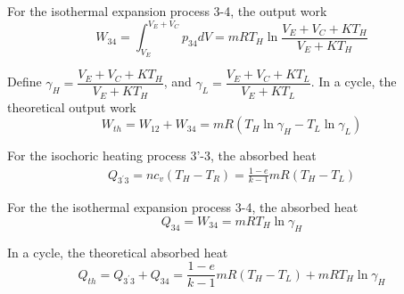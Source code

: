 For the isothermal expansion process 3-4, the output work
\begin{equation}
	W_{34} = \int^{V_E+V_C}_{V_E}{p_{34}dV}=mRT_H\ln{\frac{V_E+V_C+KT_H}{V_E+KT_H}}
\end{equation}

Define $\gamma_H = \dfrac{V_E+V_C+KT_H}{V_E+KT_H}$, and $\gamma_L = \dfrac{V_E+V_C+KT_L}{V_E+KT_L}$. In a cycle, the theoretical output work
\begin{equation}
	W_{th} = W_{12} + W_{34} = mR(T_H\ln\gamma_H - T_L\ln\gamma_L)
\end{equation}

For the isochoric heating process 3'-3, the absorbed heat
\begin{equation}
	\begin{split}
		Q_{3^{'}3} = nc_v(T_H-T_R)
		=\frac{1-e}{k-1}mR(T_H-T_L)
	\end{split}
\end{equation}


For the the isothermal expansion process 3-4, the absorbed heat
\begin{equation}
	Q_{34} = W_{34} = mRT_H\ln\gamma_H
\end{equation}

In a cycle, the theoretical absorbed heat
\begin{equation}
	Q_{th} = Q_{3^{'}3} + Q_{34} = \frac{1-e}{k-1}mR(T_H-T_L) + mRT_H\ln\gamma_H
\end{equation}


%
%

